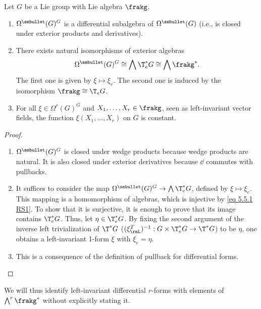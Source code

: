 \begin{prop}[{{\cite[Prop.~5.5.2]{RS1}}}]\label{prop 5.5.2 RS1}
    Let $G$ be a Lie group with Lie algebra $\frakg$.
    \begin{enumerate}
        \item $\Omega^{\smbullet }(G)^G$ is a differential subalgebra of $\Omega^{\smbullet }(G)$ (i.e., is closed under exterior products and derivatives).
        \item There exists natural isomorphisms of exterior algebras
        \[\Omega^{\smbullet }(G)^G\cong \bigwedge \T^\ast_e G\cong \bigwedge \frakg^\ast.\]
        The first one is given by $\xi\mapsto \xi_e$. The second one is induced by the isomorphism $\frakg\cong \T_eG$.
        \item For all $\xi\in\Omega^r(G)^G$ and $X_1,\ldots,X_r\in\frakg$, seen as left-invariant vector fields, the function $\xi(X_1,\ldots,X_r)$ on $G$ is constant.
    \end{enumerate}
\end{prop}
\begin{proof}
    \begin{enumerate}
        \item $\Omega^{\smbullet }(G)^G$ is closed under wedge products because wedge products are natural. It is also closed under exterior derivatives because $\dd$ commutes with pullbacks.
        \item It suffices to consider the map $\Omega^{\smbullet }(G)^G\to\bigwedge \T^\ast_e G$, defined by $\xi\mapsto\xi_e$. This mapping is a homomorphism of algebras, which is injective by \eqref{eq 5.5.1 RS1}. To show that it is surjective, it is enough to prove that its image contains $\T^\ast_e G$. Thus, let $\eta\in \T^\ast_e G$. By fixing the second argument of the inverse left trivialization of $\T^\ast G$ ($(\xi_\rmL^T)^{-1}:G\times \T_e^\ast G\to \T^\ast G$) to be $\eta$, one obtains a left-invariant 1-form $\xi$ with $\xi_e=\eta$.
        \item  This is a consequence of the definition of pullback for differential forms.
    \end{enumerate}
\end{proof}

We will thus identify left-invariant differential $r$-forms with elements of $\bigwedge^r\frakg^\ast$ without explicitly stating it. 


